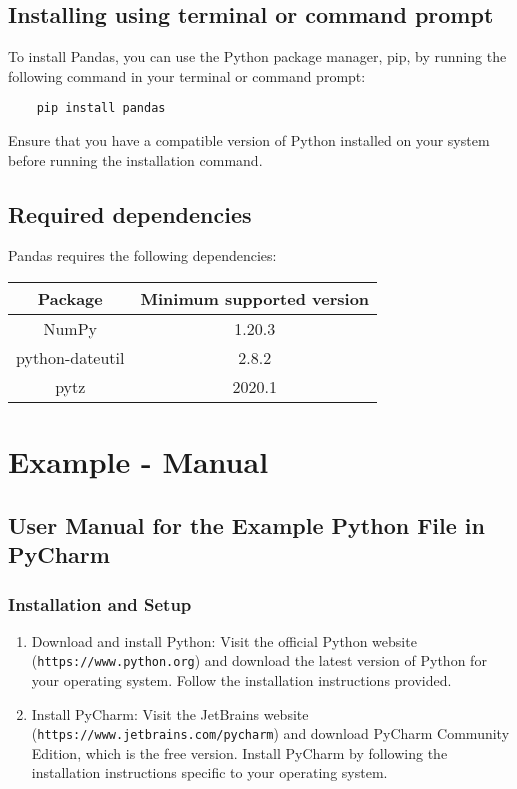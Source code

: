 \subsection{Installing using terminal or command prompt}

To install Pandas, you can use the Python package manager, pip, by running the following command in your terminal or command prompt:

\begin{verbatim}
	pip install pandas
\end{verbatim}

Ensure that you have a compatible version of Python installed on your system before running the installation command.

\subsection{Required dependencies}

Pandas requires the following dependencies:


\begin{center}
	\begin{tabular}{ |c|c| }
		\hline
		Package & Minimum supported version \\
		\hline
		NumPy & 1.20.3 \\
		python-dateutil & 2.8.2 \\
		pytz & 2020.1 \\
		\hline
	\end{tabular}
\end{center}

\section{Example - Manual}
\subsection{User Manual for the Example Python File in PyCharm}
\subsubsection{Installation and Setup}
\begin{enumerate}
	\item Download and install Python: Visit the official Python website (\texttt{https://www.python.org}) and download the latest version of Python for your operating system. Follow the installation instructions provided.
	\item Install PyCharm: Visit the JetBrains website (\texttt{https://www.jetbrains.com/pycharm}) and download PyCharm Community Edition, which is the free version. Install PyCharm by following the installation instructions specific to your operating system.
\end{enumerate}

